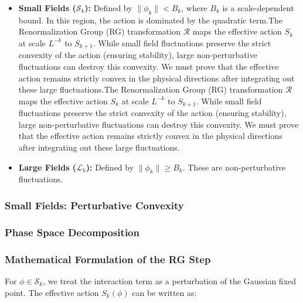 \begin{itemize}

    \item \textbf{Small Fields ($\mathcal{S}_k$):} Defined by $\|\phi_k\| < B_k$, where $B_k$ is a scale-dependent bound. In this region, the action is dominated by the quadratic term.The Renormalization Group (RG) transformation $\mathcal{R}$ maps the effective action $S_k$ at scale $L^{-k}$ to $S_{k+1}$. While small field fluctuations preserve the strict convexity of the action (ensuring stability), large non-perturbative fluctuations can destroy this convexity. We must prove that the effective action remains strictly convex in the physical directions after integrating out these large fluctuations.The Renormalization Group (RG) transformation $\mathcal{R}$ maps the effective action $S_k$ at scale $L^{-k}$ to $S_{k+1}$. While small field fluctuations preserve the strict convexity of the action (ensuring stability), large non-perturbative fluctuations can destroy this convexity. We must prove that the effective action remains strictly convex in the physical directions after integrating out these large fluctuations.

    \item \textbf{Large Fields ($\mathcal{L}_k$):} Defined by $\|\phi_k\| \ge B_k$. These are non-perturbative fluctuations.

\end{itemize}



\subsubsection{Small Fields: Perturbative Convexity}\subsubsection{Phase Space Decomposition}\subsubsection{Mathematical Formulation of the RG Step}

For $\phi \in \mathcal{S}_k$, we treat the interaction term as a perturbation of the Gaussian fixed point. The effective action $S_k(\phi)$ can be written as:

